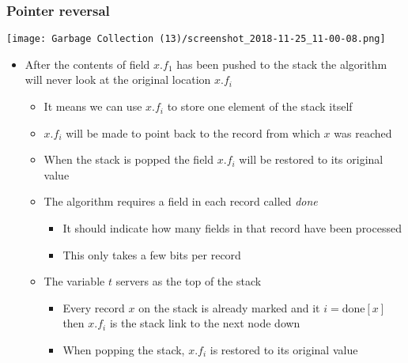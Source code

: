 \documentclass[11pt]{article}
\begin{document}
\subsubsection{Pointer reversal}
\label{sec:org3c184b4}
\begin{center}
\texttt{[image: Garbage Collection (13)/screenshot\_2018-11-25\_11-00-08.png]}
\end{center}
\begin{itemize}
\item After the contents of field \(x.f_1\) has been pushed to the stack the algorithm will never look at the original location \(x.f_i\)
\begin{itemize}
\item It means we can use \(x.f_i\) to store one element of the stack itself
\item \(x.f_i\) will be made to point back to the record from which \(x\) was reached
\item When the stack is popped the field \(x.f_i\) will be restored to its original value
\item The algorithm requires a field in each record called \emph{done}
\begin{itemize}
\item It should indicate how many fields in that record have been processed
\item This only takes a few bits per record
\end{itemize}
\item The variable \(t\) servers as the top of the stack
\begin{itemize}
\item Every record \(x\) on the stack is already marked and it \(i=\text{done}[x]\) then \(x.f_i\) is the stack link to the next node down
\item When popping the stack, \(x.f_i\) is restored to its original value
\end{itemize}
\end{itemize}
\end{itemize}
\end{document}
